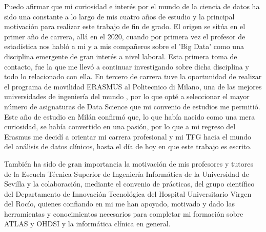

Puedo afirmar que mi curiosidad e interés por el mundo de la ciencia de datos ha sido una constante a lo largo de mis cuatro años de estudio y la principal motivación para realizar este trabajo de fin de grado. El origen se sitúa en el primer año de carrera, allá en el 2020, cuando por primera vez el profesor de estadística nos habló a mi y a mis compañeros sobre el 'Big Data' como una disciplina emergente de gran interés a nivel laboral. Esta primera toma de contacto, fue la que me llevó a continuar investigando sobre dicha disciplina y todo lo relacionado con ella. En tercero de carrera tuve la oportunidad de realizar el programa de movilidad ERASMUS al Politecnico di Milano, una de las mejores universidades de ingeniería del mundo \cite{QSPolimi}, por lo que opté a seleccionar el mayor número de asignaturas de Data Science que mi convenio de estudios me permitió. Este año de estudio en Milán confirmó que, lo que había nacido como una mera curiosidad, se había convertido en una pasión, por lo que a mi regreso del Erasmus me decidí a orientar mi carrera profesional y mi TFG hacia el mundo del análisis de datos clínicos, hasta el día de hoy en que este trabajo es escrito.

También ha sido de gran importancia la motivación de mis profesores y tutores de la Escuela Técnica Superior de Ingeniería Informática de la Universidad de Sevilla y la colaboración, mediante el convenio de prácticas, del grupo científico del Departamento de Innovación Tecnológica del Hospital Universitario Virgen del Rocío, quienes confiando en mi me han apoyado, motivado y dado las herramientas y conocimientos necesarios para completar mi formación sobre ATLAS y OHDSI y la informática clínica en general.
